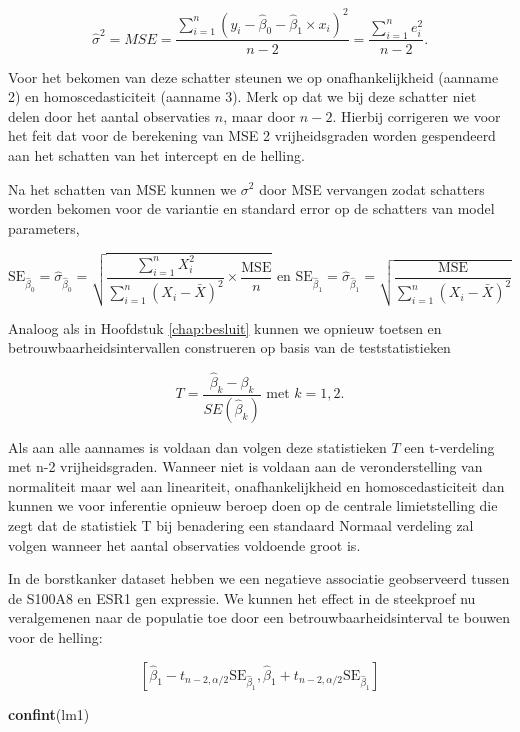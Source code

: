 \documentclass[
  12pt,dutch,coursenotes]{book}
\newenvironment{Shaded}{\begin{snugshade}}{\end{snugshade}}
\newcommand{\KeywordTok}[1]{\textcolor[rgb]{0.13,0.29,0.53}{\textbf{#1}}}
\newcommand{\NormalTok}[1]{#1}
\theoremstyle{definition}
\theoremstyle{definition}
\theoremstyle{definition}
\theoremstyle{remark}
\begin{document}
\[\hat\sigma^2=MSE=\frac{\sum\limits_{i=1}^n \left(y_i-\hat\beta_0-\hat\beta_1\times x_i\right)^2}{n-2}=\frac{\sum\limits_{i=1}^n e^2_i}{n-2}.\]

Voor het bekomen van deze schatter steunen we op onafhankelijkheid (aanname 2) en homoscedasticiteit (aanname 3). Merk op dat we bij deze schatter niet delen door het aantal observaties \(n\), maar door \(n-2\). Hierbij corrigeren we voor het feit dat voor de berekening van MSE 2 vrijheidsgraden worden gespendeerd aan het schatten van het intercept en de helling.

Na het schatten van MSE kunnen we \(\sigma^2\) door MSE vervangen zodat schatters worden bekomen voor de variantie en standard error op de schatters van model parameters,

\[\text{SE}_{\hat{\beta}_0}=\hat\sigma_{\hat{\beta}_0}=\sqrt{\frac{\sum\limits_{i=1}^n X^2_i}{\sum\limits_{i=1}^n (X_i-\bar X)^2} \times\frac{\text{MSE}}{n}} \text{ en } \text{SE}_{\hat{\beta}_1}=\hat\sigma_{\hat{\beta}_1}=\sqrt{\frac{\text{MSE}}{\sum\limits_{i=1}^n (X_i-\bar X)^2}}\]

Analoog als in Hoofdstuk \ref{chap:besluit} kunnen we opnieuw toetsen en betrouwbaarheidsintervallen construeren op basis van de teststatistieken

\[T=\frac{\hat{\beta}_k-\beta_k}{SE(\hat{\beta}_k)} \text{ met } k=1,2.\]

Als aan alle aannames is voldaan dan volgen deze statistieken \(T\) een t-verdeling met n-2 vrijheidsgraden.
Wanneer niet is voldaan aan de veronderstelling van normaliteit maar wel aan lineariteit, onafhankelijkheid en homoscedasticiteit dan kunnen we voor inferentie opnieuw beroep doen op de centrale limietstelling die zegt dat de statistiek T bij benadering een standaard Normaal verdeling zal volgen wanneer het aantal observaties voldoende groot is.

In de borstkanker dataset hebben we een negatieve associatie geobserveerd tussen de S100A8 en ESR1 gen expressie.
We kunnen het effect in de steekproef nu veralgemenen naar de populatie toe door een betrouwbaarheidsinterval te bouwen voor de helling:

\[[\hat\beta_1 - t_{n-2,\alpha/2} \text{SE}_{\hat\beta_1},\hat\beta_1 + t_{n-2,\alpha/2} \text{SE}_{\hat\beta_1}]\]

\begin{Shaded}
\begin{Highlighting}[]
\KeywordTok{confint}\NormalTok{(lm1)}
\end{Highlighting}
\end{Shaded}
\end{document}
